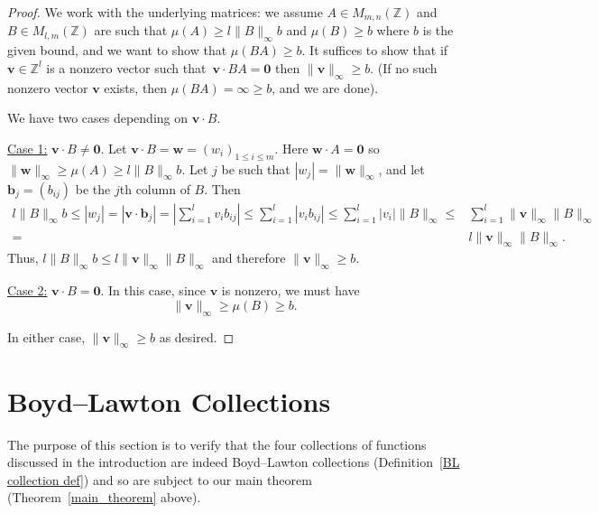 \documentclass[12pt]{amsart}
\theoremstyle{plain}
\theoremstyle{definition}
\theoremstyle{remark}
\numberwithin{theorem}{section}
\numberwithin{equation}{section} %
\newcommand{\ZZ}{\mathbb{Z}}
\def \bfv{{\mathbf v}}
\newcommand{\mb}{\mathbf}
\begin{document}
\begin{proof}
We work with the underlying matrices:
we assume $A\in M_{m,n}(\ZZ)$ and $B\in M_{l,m}(\ZZ)$ are such that $\mu(A)\geq l\|B\|_\infty b$ and $\mu(B)\geq  b$ where $b$ is the given bound,
and we want to show that $\mu(BA) \ge b$.
It suffices to show that 
if $\mathbf{v}\in\ZZ^l$ 
is a nonzero vector such that~$\mathbf{v}\cdot BA=\mathbf{0}$ then $\| \mb v \|_\infty \ge b$.
(If no such nonzero vector $\bfv$ exists, then $\mu(BA)=\infty \ge b$, and we are done).

We have two cases depending on $\bfv \cdot B$.

\noindent \underline{Case 1:} $\mathbf{v}\cdot B\neq \mathbf{0}$.  Let $\mathbf{v}\cdot B=\mathbf{w}=(w_i)_{1\leq i \leq m}$. 
Here $\mb w \cdot A = \mb 0$ so 
$\|\mathbf{w}\|_\infty\geq \mu(A)\geq l\|B\|_\infty b$.
Let $j$ be such that $|w_j|=\|\mathbf{w}\|_\infty$, and let $\mathbf{b}_j = (b_{ij})$ be the $j$th column of $B$.  Then 
\begin{align*}
l\|B\|_\infty b \leq  |w_j| = |\mathbf{v}\cdot \mathbf{b}_j| = \left |\sum_{i=1}^l v_ib_{ij}\right |\leq  \sum_{i=1}^l |v_ib_{ij}| \leq  \sum_{i=1}^l|v_i|\|B\|_\infty  \leq&  \sum_{i=1}^l\|\mathbf{v}\|_\infty\|B\|_\infty\\ 
 = &l\|\mathbf{v}\|_\infty\|B\|_\infty.
\end{align*}
Thus, $l\|B\|_\infty b\leq l\|\mathbf{v}\|_\infty\|B\|_\infty $ and therefore $\|\mathbf{v}\|_\infty\geq b.$

\medskip\noindent \underline{Case 2:} 
$\mathbf{v}\cdot B=\mathbf{0}.$  In this case, since $\mathbf{v}$ is nonzero, we must have 
\[\|\mathbf{v}\|_\infty\geq\mu(B)\geq b.\]

\medskip\noindent
In either case, $\|\mathbf{v}\|_\infty\geq b$
as desired. 
\end{proof}




\section{Boyd--Lawton Collections} \label{section_BL_Collections}

The purpose of this section is to verify that the four collections of functions discussed 
in the introduction are indeed Boyd--Lawton collections (Definition~\ref{BL collection def}) and so are subject to our main theorem (Theorem~\ref{main_theorem} above). %
\end{document}
